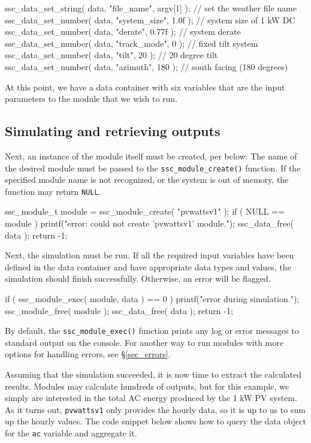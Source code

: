 \documentclass{article}
\begin{document}
\begin{verbatimtab}[4]
	ssc_data_set_string( data, "file_name", argv[1] ); // set the weather file name
	ssc_data_set_number( data, "system_size", 1.0f );  // system size of 1 kW DC
	ssc_data_set_number( data, "derate", 0.77f );      // system derate
	ssc_data_set_number( data, "track_mode", 0 );      // fixed tilt system
	ssc_data_set_number( data, "tilt", 20 );           // 20 degree tilt
	ssc_data_set_number( data, "azimuth", 180 );       // south facing (180 degrees)
\end{verbatimtab}

At this point, we have a data container with six variables that are the input parameters to the module that we wish to run.  

\subsection{Simulating and retrieving outputs}
\label{sec_ex_pvwatts_module}

Next, an instance of the module itself must be created, per below.  The name of the desired module must be passed to the \texttt{ssc\_module\_create()} function.  If the specified module name is not recognized, or the system is out of memory, the function may return \texttt{NULL}.

\begin{verbatimtab}[4]
	ssc_module_t module = ssc_module_create( "pvwattsv1" );
	if ( NULL == module )
	{
		printf("error: could not create 'pvwattsv1' module.\n");
		ssc_data_free( data );
		return -1;
	}
\end{verbatimtab}

Next, the simulation must be run.  If all the required input variables have been defined in the data container and have appropriate data types and values, the simulation should finish successfully.  Otherwise, an error will be flagged.  

\begin{verbatimtab}[4]
	if ( ssc_module_exec( module, data ) == 0 )
	{
		printf("error during simulation.\n");
		ssc_module_free( module );
		ssc_data_free( data );
		return -1;
	}
\end{verbatimtab}

By default, the \texttt{ssc\_module\_exec()} function prints any log or error messages to standard output on the console. For another way to run modules with more options for handling errors, see \S\ref{sec_errors}.

Assuming that the simulation succeeded, it is now time to extract the calculated results.  Modules may calculate hundreds of outputs, but for this example, we simply are interested in the total AC energy produced by the 1 kW PV system.  As it turns out, \texttt{pvwattsv1} only provides the hourly data, so it is up to us to sum up the hourly values.  The code snippet below shows how to query the data object for the \texttt{ac} variable and aggregate it.
\end{document}
